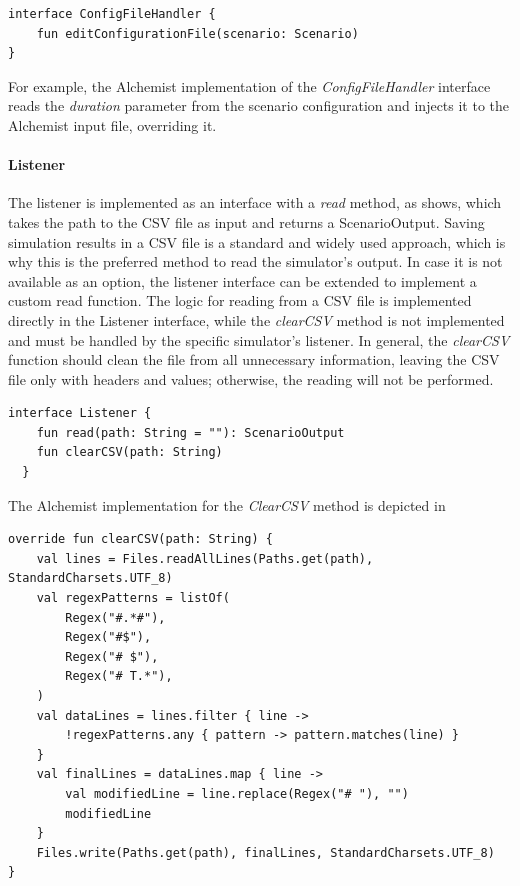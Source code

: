 \documentclass[12pt,a4paper,openright,twoside]{book}
\begin{document}
\begin{lstlisting}[style=my-kotlin, language=my-kotlin, label={lst:configfilehandler}, caption={ConfigFileHandler interface.}]
  interface ConfigFileHandler {
    fun editConfigurationFile(scenario: Scenario)
}
\end{lstlisting}

For example, the Alchemist implementation of the \emph{ConfigFileHandler} interface reads the \emph{duration} parameter from the scenario configuration and injects it to the Alchemist input file, overriding it.

\paragraph*{Listener}
The listener is implemented as an interface with a \emph{read} method, as  shows, which takes the path to the CSV file as input and returns a ScenarioOutput. 
Saving simulation results in a CSV file is a standard and widely used approach, which is why this is the preferred method to read the simulator's output. 
In case it is not available as an option, the listener interface can be extended to implement a custom read function. 
The logic for reading from a CSV file is implemented directly in the Listener interface, while the \emph{clearCSV} method is not implemented and must be handled by the specific simulator's listener. 
In general, the \emph{clearCSV} function should clean the file from all unnecessary information, leaving the CSV file only with headers and values; otherwise, the reading will not be performed.

\begin{lstlisting}[style=my-kotlin, language=my-kotlin, label={lst:listener-interface}, caption={Listener interface.}]
  interface Listener {
    fun read(path: String = ""): ScenarioOutput
    fun clearCSV(path: String)
  }
\end{lstlisting}

The Alchemist implementation for the \emph{ClearCSV} method is depicted in 

\begin{lstlisting}[style=my-kotlin, language=my-kotlin, label={lst:alchemist-list}, caption={CSV file cleaning in Alchemist.}]
override fun clearCSV(path: String) {
    val lines = Files.readAllLines(Paths.get(path), StandardCharsets.UTF_8)
    val regexPatterns = listOf(
        Regex("#.*#"),
        Regex("#$"),
        Regex("# $"),
        Regex("# T.*"),
    )
    val dataLines = lines.filter { line ->
        !regexPatterns.any { pattern -> pattern.matches(line) }
    }
    val finalLines = dataLines.map { line ->
        val modifiedLine = line.replace(Regex("# "), "")
        modifiedLine
    }
    Files.write(Paths.get(path), finalLines, StandardCharsets.UTF_8)
}
\end{lstlisting}
\end{document}

